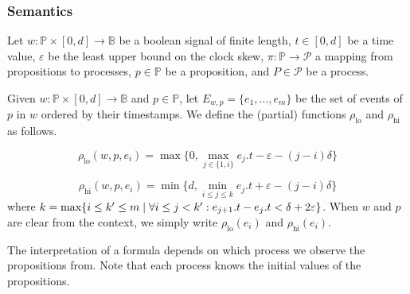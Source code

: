 \documentclass[envcountsame, runningheads]{llncs}
\newcommand{\B}{\mathbb{B}}
\newcommand{\?}{\text{?}}
\newcommand{\suchthat}{\;\ifnum\currentgrouptype=16 \middle\fi|\;}
\let\st\suchthat
\begin{document}
	\subsubsection*{Semantics}
	Let $w : \mathbb{P} \times [0,d] \to \B$ be a boolean signal of finite length, $t \in [0,d]$ be a time value, $\varepsilon$ be the least upper bound on the clock skew, $\pi : \mathbb{P} \to \mathcal{P}$ a mapping from propositions to processes, $p \in \mathbb{P}$ be a proposition, and $P \in \mathcal{P}$ be a process.
	
	Given $w : \mathbb{P} \times [0,d] \to \B$ and $p \in \mathbb{P}$, let $E_{w,p} = \{e_1, \ldots, e_m\}$ be the set of events of $p$ in $w$ ordered by their timestamps.
	We define the (partial) functions $\rho_{\text{lo}}$ and $\rho_{\text{hi}}$ as follows.
	
	$$ \rho_{\text{lo}}(w, p, e_i) = \max\{0, \max_{j \in \{1, i\}} e_j.t - \varepsilon - (j-i)\delta\} $$
	
	$$ \rho_{\text{hi}}(w, p, e_i) = \min\{d, \min_{i \leq j \leq k} e_j.t + \varepsilon - (j-i)\delta\} $$
	where $k = \max \{i \leq k' \leq m \st \forall i \leq j < k' : e_{j + 1}.t - e_j.t < \delta + 2\varepsilon\}$.
	When $w$ and $p$ are clear from the context, we simply write $\rho_{\text{lo}}(e_i)$ and $\rho_{\text{hi}}(e_i)$.
		
	The interpretation of a formula depends on which process we observe the propositions from.
	Note that each process knows the initial values of the propositions.
	
\end{document}
